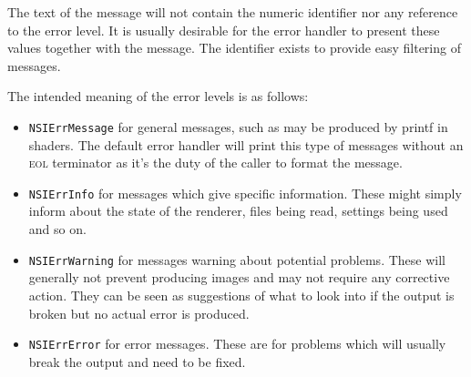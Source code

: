 \documentclass[oneside,ebook]{memoir}
\newcommand*{\acronym}[1]{\textsc{\lowercase{#1}}}
\begin{document}
The text of the message will not contain the numeric identifier nor any reference to the error level. It is usually desirable for the error handler to present these values together with the message. The identifier exists to provide easy filtering of messages.

The intended meaning of the error levels is as follows:
\firmlists
\begin{itemize}
	\item \lstinline|NSIErrMessage| for general messages, such as may be produced by printf in shaders. The default error handler will print this type of messages without an \acronym{EOL} terminator as it's the duty of the caller to format the message.
	\item \lstinline|NSIErrInfo| for messages which give specific information. These might simply inform about the state of the renderer, files being read, settings being used and so on.
	\item \lstinline|NSIErrWarning| for messages warning about potential problems. These will generally not prevent producing images and may not require any corrective action. They can be seen as suggestions of what to look into if the output is broken but no actual error is produced.
	\item \lstinline|NSIErrError| for error messages. These are for problems which will usually break the output and need to be fixed.
\end{itemize}
\end{document}
